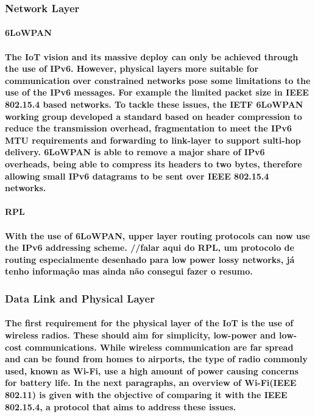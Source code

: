 \subsubsection{Network Layer}

\paragraph{\textbf{6LoWPAN}}
\paragraph{
	The \ac{IoT} vision and its massive deploy can only be achieved through the use of IPv6. However, physical layers more suitable for communication over constrained networks pose some limitations to the use of the IPv6 messages. For example the limited packet size in IEEE 802.15.4 based networks. To tackle these issues, the \ac{IETF} 6LoWPAN working group developed a standard based on header compression to reduce the transmission overhead, fragmentation to meet the IPv6 \ac{MTU} requirements and forwarding to link-layer to support sulti-hop delivery. \cite{Hui2008}
	6LoWPAN is able to remove a major share of IPv6 overheads, being able to compress its headers to two bytes, therefore allowing small IPv6 datagrams to be sent over IEEE 802.15.4 networks. 
}

\paragraph{\textbf{RPL}}
\paragraph{
	With the use of 6LoWPAN, upper layer routing protocols can now use the IPv6 addressing scheme.
	//falar aqui do RPL, um protocolo de routing especialmente desenhado para low power lossy networks, já tenho informação mas ainda não consegui fazer o resumo.
}

\subsubsection{Data Link and Physical Layer}

\paragraph{
The first requirement for the physical layer of the \ac{IoT} is the use of wireless radios. These should aim for simplicity, low-power and low-cost communications. While wireless communication are far spread and can be found from homes to airports, the type of radio commonly used, known as Wi-Fi, use a high amount of power causing concerns for battery life. In the next paragraphs, an overview of Wi-Fi(IEEE 802.11) is given with the objective of comparing it with the IEEE 802.15.4, a protocol that aims to address these issues.
}

